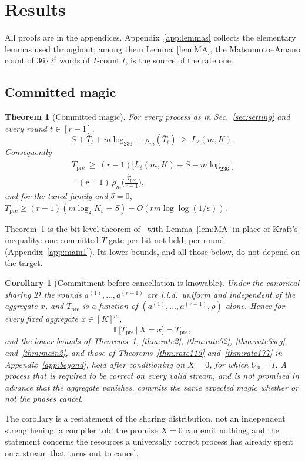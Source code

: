 \documentclass[aps,prx,twocolumn,superscriptaddress,nofootinbib,longbibliography]{revtex4-2}
\theoremstyle{plain}
\newtheorem{theorem}{Theorem}
\newtheorem{corollary}{Corollary}
\theoremstyle{definition}
\theoremstyle{remark}
\newcommand{\Tpre}{T_{\mathrm{pre}}}
\newcommand{\E}{\mathbb{E}}
\begin{document}
\section{Results}\label{sec:results}

All proofs are in the appendices. Appendix~\ref{app:lemmas} collects the elementary lemmas used throughout; among them Lemma~\ref{lem:MA}, the Matsumoto--Amano count of $36\cdot2^t$ words of $T$-count $t$, is the source of the rate one.

\subsection{Committed magic}\label{sec:main1}

\begin{theorem}[Committed magic]\label{thm:main1}
For every process as in Sec.~\ref{sec:setting} and every round $t\in[r-1]$,
\begin{equation}\label{eq:main1}
S+\bar T_t+m\log_236+\rho_m(\bar T_t)\ \ge\ L_\delta(m,K).
\end{equation}
Consequently
\begin{multline}
\bar\Tpre\ \ge\ (r-1)\big[L_\delta(m,K)-S-m\log_236\big]\\-(r-1)\,\rho_m\!\Big(\frac{\bar\Tpre}{r-1}\Big),
\end{multline}
and for the tuned family and $\delta=0$, $\Tpre\ge(r-1)(m\log_2K_\varepsilon-S)-O(rm\log\log(1/\varepsilon))$.
\end{theorem}
Theorem~\ref{thm:main1} is the bit-level theorem of~\cite{Paper1} with Lemma~\ref{lem:MA} in place of Kraft's inequality: one committed $T$ gate per bit not held, per round (Appendix~\ref{app:main1}). Its lower bounds, and all those below, do not depend on the target.

\begin{corollary}[Commitment before cancellation is knowable]\label{cor:identity}
Under the canonical sharing $\mathcal D$ the rounds $a^{(1)},\dots,a^{(r-1)}$ are i.i.d.\ uniform and independent of the aggregate $x$, and $\Tpre$ is a function of $(a^{(1)},\dots,a^{(r-1)},\rho)$ alone. Hence for every fixed aggregate $x\in[K]^m$,
\[
\E\big[\Tpre\,\big|\,X=x\big]=\bar\Tpre ,
\]
and the lower bounds of Theorems~\ref{thm:main1}, \ref{thm:rate2}, \ref{thm:rate52}, \ref{thm:rate3seg} and~\ref{thm:main2}, and those of Theorems~\ref{thm:rate115} and~\ref{thm:rate177} in Appendix~\ref{app:beyond}, hold after conditioning on $X=0$, for which $U_x=I$. A process that is required to be correct on every valid stream, and is not promised in advance that the aggregate vanishes, commits the same expected magic whether or not the phases cancel.
\end{corollary}
The corollary is a restatement of the sharing distribution, not an independent strengthening: a compiler told the promise $X=0$ can emit nothing, and the statement concerns the resources a universally correct process has already spent on a stream that turns out to cancel.
\end{document}
